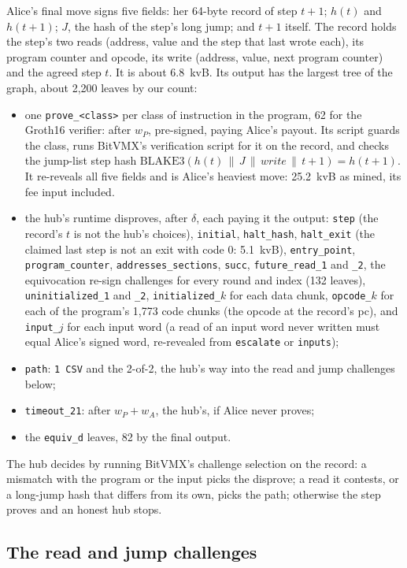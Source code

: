 \documentclass[11pt]{article}
\newcommand{\tx}[1]{\texttt{#1}}
\begin{document}
Alice's final move signs five fields: her 64-byte record of step
$t+1$; $h(t)$ and $h(t+1)$; $J$, the hash of the step's long jump; and
$t+1$ itself. The record holds the step's two reads (address, value and
the step that last wrote each), its program counter and opcode, its
write (address, value, next program counter) and the agreed step $t$.
It is about 6.8~kvB. Its output has the largest tree of the graph,
about 2,200 leaves by our count:
\begin{itemize}[leftmargin=1.5em]
\item one \tx{prove\_<class>} per class of instruction in the program,
  62 for the Groth16 verifier: after $w_P$, pre-signed, paying Alice's
  payout. Its script guards the class, runs BitVMX's verification script
  for it on the record, and checks the jump-list step hash
  $\mathrm{BLAKE3}(h(t) \,\|\, J \,\|\, \mathit{write} \,\|\, t+1) =
  h(t+1)$. It re-reveals all five fields and is Alice's heaviest move:
  25.2~kvB as mined, its fee input included.
\item the hub's runtime disproves, after $\delta$, each paying it the
  output: \tx{step} (the record's $t$ is not the hub's choices),
  \tx{initial}, \tx{halt\_hash}, \tx{halt\_exit} (the claimed last step
  is not an exit with code 0: 5.1~kvB), \tx{entry\_point},
  \tx{program\_counter}, \tx{addresses\_sections}, \tx{succ},
  \tx{future\_read\_1} and \tx{\_2}, the equivocation re-sign challenges
  for every round and index (132 leaves), \tx{uninitialized\_1} and
  \tx{\_2}, \tx{initialized\_$k$} for each data chunk, \tx{opcode\_$k$}
  for each of the program's 1,773 code chunks (the opcode at the
  record's pc), and \tx{input\_$j$} for each input word (a read of an
  input word never written must equal Alice's signed word, re-revealed
  from \tx{escalate} or \tx{inputs});
\item \tx{path}: \texttt{1 CSV} and the 2-of-2, the hub's way into the
  read and jump challenges below;
\item \tx{timeout\_21}: after $w_P + w_A$, the hub's, if Alice never
  proves;
\item the \tx{equiv\_d} leaves, 82 by the final output.
\end{itemize}
The hub decides by running BitVMX's challenge selection on the record:
a mismatch with the program or the input picks the disprove; a read it
contests, or a long-jump hash that differs from its own, picks the
path; otherwise the step proves and an honest hub stops.

\subsection{The read and jump challenges}
\label{sec:tail}
\end{document}

